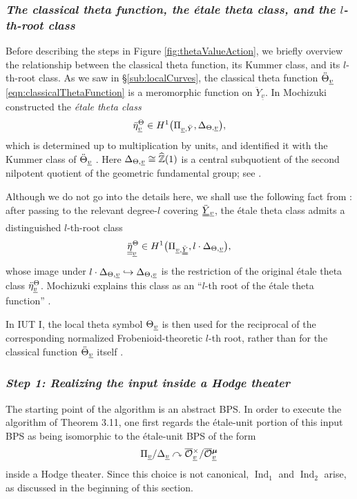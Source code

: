 \documentclass[12pt, reqno, a4paper]{amsart}
\def\udl#1{\underline{#1}} %
\def\acton{\curvearrowright} %
\def\bZ{\mathbb{Z}} %
\def\uv{\udl{v}} %
\DeclareMathOperator{\Ind}{Ind}
\begin{document}
\subsubsection{\emph{The classical theta function, the \'etale theta class, and the \(l\)-th-root class}}\label{subsub:thetaRootClass}
Before describing the steps in Figure \ref{fig:thetaValueAction}, we briefly overview the relationship between the classical theta function, its Kummer class, and its \(l\)-th-root class.
As we saw in \S\ref{sub:localCurves}, the classical theta function
\(\ddot{\Th}_{\uv}\) \eqref{eqn:classicalThetaFunction} is a meromorphic function on \(\ddot{Y}_{\uv}\).
In \cite[Prop.~1.3, pp.~245--247]{MR2512782} Mochizuki constructed the {\it \'etale theta class}
\[
  \ddot{\eta}^{\Th}_{\uv}
  \in
  H^1\bigl(\Pi_{\uv,\ddot{Y}},\Delta_{\Th,\uv}\bigr),
\]
which is determined up to multiplication by units, and identified it with the Kummer class of \(\ddot{\Th}_{\uv}\) \cite[Prop.~1.4(iii), p.~248]{MR2512782}.
Here \(\Delta_{\Th,\uv}\cong\widehat{\bZ}(1)\) is a central subquotient of the second nilpotent quotient of the geometric fundamental group; see \cite[\S1, pp.~238--239]{MR2512782}.


Although we do not go into the details here, we shall use the following
fact from \cite{MR2512782}: after passing to the relevant degree-\(l\) covering
\(\dduuY{}_{\uv}\), the \'etale theta class admits a distinguished
\(l\)-th-root class
\[
  \ddot{\underline{\underline{\eta}}}^{\Th}_{\uv}
  \in
  H^1\bigl(\Pi_{\uv,\dduuY}, l\cdot\Delta_{\Th,\uv} \bigr),
\]
whose image under \(l\cdot\Delta_{\Th,\uv}\hookrightarrow\Delta_{\Th,\uv}\)
is the restriction of the original \'etale theta class
\(\ddot{\eta}^{\Th}_{\uv}\).
Mochizuki explains this class as an
``\(l\)-th root of the \'etale theta function''
\cite[Prop.~2.2(ii), p.~263; discussion preceding Def.~2.7, p.~267]{MR2512782}.

In IUT I, the local theta symbol \(\Th_{\uv}\) is then used for the reciprocal of the corresponding normalized Frobenioid-theoretic \(l\)-th root, rather than for the classical function \(\ddot{\Th}_{\uv}\) itself \cite[Ex.~3.2(ii), pp.~79--80]{MR4225473}.

\subsubsection{\emph{Step 1: Realizing the input inside a Hodge theater}}\label{subsub:thetaValActStep1}
The starting point of the algorithm is an abstract BPS.
In order to execute the algorithm of Theorem 3.11, one first regards the \'etale-unit portion of this input BPS as being isomorphic to the \'etale-unit BPS of the form
\[
  \Pi_{\uv}/\Delta_{\uv}\acton
  \oOOx_{\uv}/\oOOmu_{\uv}
\]
inside a Hodge theater.
Since this choice is not canonical, \(\Ind_1\) and \(\Ind_2\) arise, as discussed in the beginning of this section.
\end{document}
